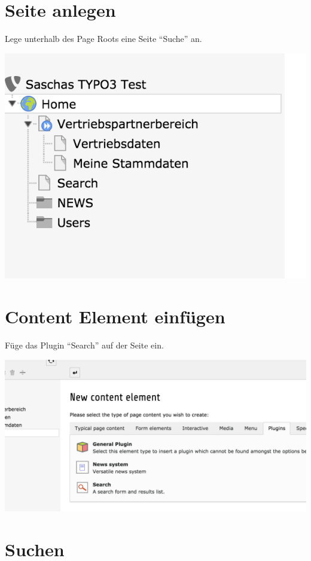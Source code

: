 \documentclass[]{book}
\begin{document}
\section{Seite anlegen}

Lege unterhalb des Page Roots eine Seite ``Suche'' an.

\includegraphics{images/searchpage.png}

\section{Content Element einfügen}

Füge das Plugin ``Search'' auf der Seite ein.

\includegraphics{images/add_plugin.png}

\section{Suchen}
\end{document}
